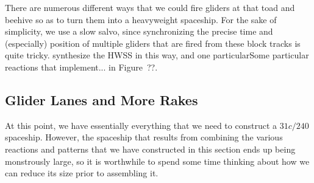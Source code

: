 
There are numerous different ways that we could fire gliders at that toad and beehive so as to turn them into a heavyweight spaceship. For the sake of simplicity, we use a slow salvo, since synchronizing the precise time and (especially) position of multiple gliders that are fired from these block tracks is quite tricky. synthesize the HWSS in this way, and one particularSome particular reactions that implement... in Figure~??.%

%
%





\subsection{Glider Lanes and More Rakes}\label{sec:silverfish_more_rakes}

At this point, we have essentially everything that we need to construct a $31c/240$ spaceship. However, the spaceship that results from combining the various reactions and patterns that we have constructed in this section ends up being monstrously large, so it is worthwhile to spend some time thinking about how we can reduce its size prior to assembling it.

